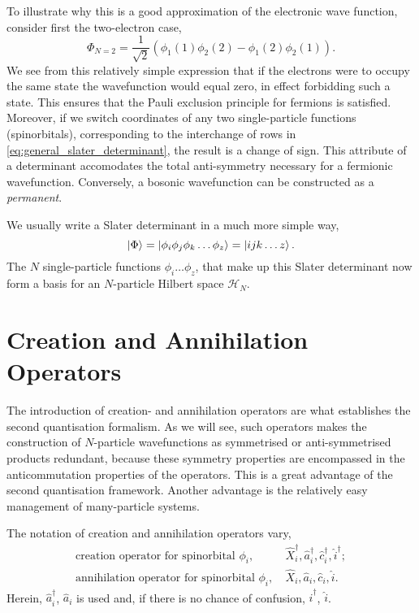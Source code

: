To illustrate why this is a good approximation of the electronic wave function,
consider first the two-electron case,
\begin{equation}
    \Phi_{N=2} = \frac{1}{\sqrt{2}}(\phi_1(1)\phi_2(2) - \phi_1(2)\phi_2(1)).
\end{equation}
We see from this relatively simple expression that if the electrons were to occupy
the same state the wavefunction would equal zero, in effect forbidding such a state.
This ensures that the Pauli exclusion principle for 
fermions is satisfied\cite{pauli1925zusammenhang}. Moreover, if we switch coordinates of any two 
single-particle functions (spinorbitals), corresponding to the interchange of rows in
\autoref{eq:general_slater_determinant}, the result is a change of sign. This attribute
of a determinant accomodates the total anti-symmetry necessary for a fermionic wavefunction.
Conversely, a bosonic wavefunction can be constructed as a \emph{permanent}.

We usually write a Slater determinant in a much more simple way,
    \begin{equation}
        \ket{\Phi} = \ket{\phi_i \phi_j \phi_k \dots \phi_z} = \ket{ijk \dots z}.
    \end{equation}
The $N$ single-particle functions $\phi_i\dots\phi_z$, that make up this Slater determinant
now form a basis for an $N$-particle Hilbert space $\mathcal{H}_N$. 

\section{Creation and Annihilation Operators}
   
    The introduction of creation- and annihilation operators are what establishes
    the second quantisation formalism. As we will see, such operators makes the 
    construction of $N$-particle wavefunctions as symmetrised or anti-symmetrised
    products redundant, because these symmetry properties are encompassed in the 
    anticommutation properties of the operators. This is a great advantage of the 
    second quantisation framework. Another advantage is the relatively easy 
    management of many-particle systems. 

    The notation of creation and annihilation operators vary,
    \begin{align*}
        \text{creation operator for spinorbital } \phi_i, &\ 
        \hat{X}_i^\dagger, \hat{a}^\dagger_i, \hat{c}_i^\dagger, \hat{i}^\dagger; \\
        \text{annihilation operator for spinorbital } \phi_i, &\ 
        \hat{X}_i, \hat{a}_i, \hat{c}_i, \hat{i}.       
    \end{align*}
    Herein, $\hat{a}_i^\dagger$, $\hat{a}_i$ is used and, if there is no chance of 
    confusion, $\hat{i}^\dagger$, $\hat{i}$.

